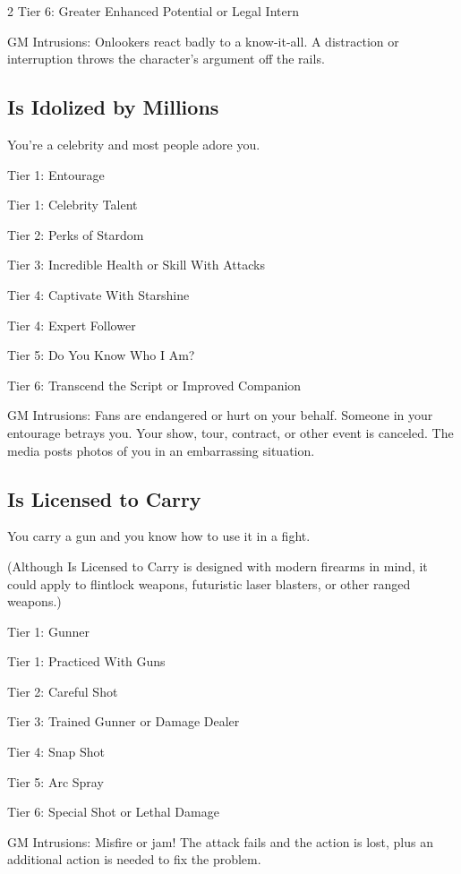 \begin{multicols}{2}
Tier 6: Greater Enhanced Potential or Legal Intern

GM Intrusions: Onlookers react badly to a know-it-all. A distraction or interruption throws the character’s argument off the rails.

\subsection{Is Idolized by Millions}

You’re a celebrity and most people adore you. 

Tier 1: Entourage

Tier 1: Celebrity Talent

Tier 2: Perks of Stardom

Tier 3: Incredible Health or Skill With Attacks

Tier 4: Captivate With Starshine

Tier 4: Expert Follower

Tier 5: Do You Know Who I Am?

Tier 6: Transcend the Script or Improved Companion

GM Intrusions: Fans are endangered or hurt on your behalf. Someone in your entourage betrays you. Your show, tour, contract, or other event is canceled. The media posts photos of you in an embarrassing situation.

\subsection{Is Licensed to Carry}

You carry a gun and you know how to use it in a fight.

(Although Is Licensed to Carry is designed with modern firearms in mind, it could apply to flintlock weapons, futuristic laser blasters, or other ranged weapons.)

Tier 1: Gunner

Tier 1: Practiced With Guns

Tier 2: Careful Shot

Tier 3: Trained Gunner or Damage Dealer

Tier 4: Snap Shot

Tier 5: Arc Spray

Tier 6: Special Shot or Lethal Damage

GM Intrusions: Misfire or jam! The attack fails and the action is lost, plus an additional action is needed to fix the problem.


\end{multicols}
